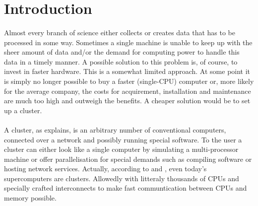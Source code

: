 \section{Introduction}
\paragraph{}
Almost every branch of science either collects or creates data that has to be processed in some way. Sometimes a single machine is unable to keep up with the sheer amount of data and/or the demand for computing power to handle this data in a timely manner. A possible solution to this problem is, of course, to invest in faster hardware. This is a somewhat limited approach. At some point it is simply no longer possible to buy a faster (single-CPU) computer or, more likely for the average company, the costs for acquirement, installation and maintenance are much too high and outweigh the benefits. A cheaper solution would be to set up a cluster.
\paragraph{}
A cluster, as  explains, is an arbitrary number of conventional computers, connected over a network and possibly running special software. To the user a cluster can either look like a single computer by simulating a multi-processor machine or offer parallelisation for special demands such as compiling software or hosting network services. Actually, according to  and , even today's supercomputers are clusters. Allowedly with litteraly thousands of CPUs and specially crafted interconnects to make fast communtication between CPUs and memory possible.
